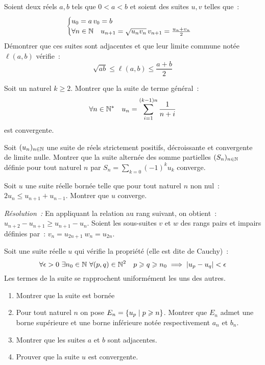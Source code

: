 \begin{exercice}
    Soient deux réels \(a, b\) tels que \(0 < a < b \) et soient des
    suites \(u, v\) telles que~:
    \[ \begin{cases} u_0 = a \, v_0 = b \\ \forall n \in \mathbb{N} \quad
        u_{n+1} = \sqrt{u_n v_n} \, v_{n+1} = \frac{u_n+v_n}{2}
    \end{cases}\]
    Démontrer que ces suites sont adjacentes et que leur limite commune
    notée \(\ell(a,b)\) vérifie~:
    \[ \sqrt{ab} \leqslant \ell(a,b) \leqslant \frac{a+b}{2}\]
\end{exercice}
\begin{exercice}
    Soit un naturel \(k \geqslant 2\). Montrer que la suite de terme
    général~:
    \[ \forall n \in \mathbb{N}^* \quad u_n = \sum_{i = 1}^{(k-1)n}
    \frac{1}{n+i} \]
    est convergente.
\end{exercice}
\begin{exercice}
    Soit \((u_n)_{n \in \mathbb{N}}\) une suite de réels strictement positifs,
    décroissante et convergente de limite nulle. Montrer que la suite
    alternée des somme partielles \((S_n)_{n\in\mathbb{N}}\) définie pour tout
    naturel \(n\) par \(S_n = \sum_{k = 0} (-1)^k u_k\) converge.
\end{exercice}
\begin{exercice}
    Soit \(u\) une suite réelle bornée telle que pour tout naturel \(n\)
    non nul~: \(2u_n \leqslant u_{n+1} + u_{n-1} \). Montrer que \(u\)
    converge.
\end{exercice}
\emph{Résolution~:}
En appliquant la relation au rang suivant, on obtient~: \(u_{n+2} -
u_{n+1} \geqslant u_{n+1} - u_n\). Soient les sous-suites \(v\) et
\(w\) des rangs pairs et impairs définies par~: \(v_n = u_{2n+1} \ w_n
= u_{2n}\).
\begin{exercice}
    Soit une suite réelle \(u\) qui vérifie la propriété (elle est dite
    de Cauchy)~:
    \[ \forall \epsilon > 0 \ \exists n_0 \in \N \ \forall (p,q) \in
    \N^2 \quad p \geqslant q \geqslant n_0 \implies \abs{u_p-u_q} <
    \epsilon \]
    Les termes de la suite se rapprochent uniformément les uns des autres.
    \begin{enumerate}
        \item Montrer que la suite est bornée
        \item Pour tout naturel \(n\) on pose \(E_n = \left\{u_p\mathrel{}\middle|\mathrel{}p\geqslant
            n\right\}\). Montrer que \(E_n\) admet une borne supérieure et une borne
            inférieure notée respectivement \(a_n\) et \(b_n\).
        \item Montrer que les suites \(a\) et \(b\) sont adjacentes.
        \item Prouver que la suite \(u\) est convergente.
    \end{enumerate}
\end{exercice}
